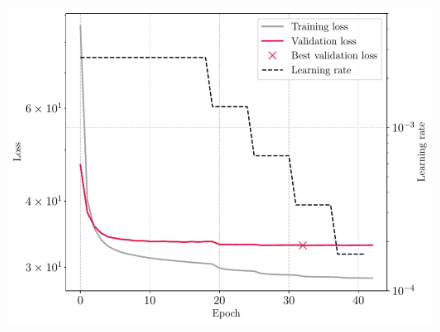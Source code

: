 \begin{figure}[H]
    \centering
    \includegraphics[width=\textwidth]{../fig/gnn/mgnn_pcseg1_simple_loss.pdf}
    \caption[GNN initial training Loss]{}
    \label{fig:gnn_initial_training_loss}
\end{figure}